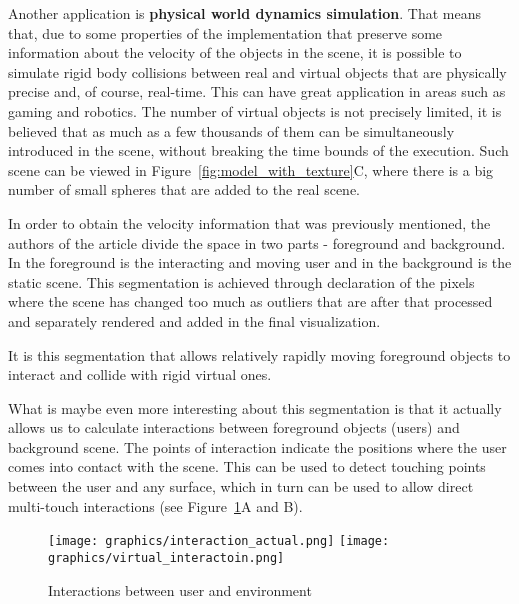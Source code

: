 \documentclass[12pt, a4paper]{article}
\theoremstyle{plain}
\begin{document}
  Another application is \textbf{physical world dynamics simulation}. That means
  that, due to some properties of the implementation that preserve some
  information about the velocity of the objects in the scene, it is possible to
  simulate rigid body collisions between real and virtual objects that are
  physically precise and, of course, real-time. This can have great application
  in areas such as gaming and robotics. The number of virtual objects is not
  precisely limited, it is believed that as much as a few thousands of them can
  be simultaneously introduced in the scene, without breaking the time bounds of
  the execution. Such scene can be viewed in
  Figure~\ref{fig:model_with_texture}C, where there is a big number of small
  spheres that are added to the real scene.

  In order to obtain the velocity information that was previously mentioned, the
  authors of the article divide the space in two parts - foreground and
  background. In the foreground is the interacting and moving user and in the
  background is the static scene. This segmentation is achieved through
  declaration of the pixels where the scene has changed too much as outliers
  that are after that processed and separately rendered and added in the final
  visualization. 

  It is this segmentation that allows relatively rapidly moving foreground
  objects to interact and collide with rigid virtual ones. 

  What is maybe even more interesting about this segmentation is that it
  actually allows us to calculate interactions between foreground objects
  (users) and background scene. The points of interaction indicate the positions
  where the user comes into contact with the scene. This can be used to detect
  touching points between the user and any surface, which in turn can be used to
  allow direct multi-touch interactions (see Figure~\ref{fig:interactions}A and
  B).

  \begin{figure}[h]
    \centering
    \texttt{[image: graphics/interaction\_actual.png]}
    \texttt{[image: graphics/virtual\_interactoin.png]}
    \caption{Interactions between user and environment}
    \label{fig:interactions}
  \end{figure}
\end{document}
